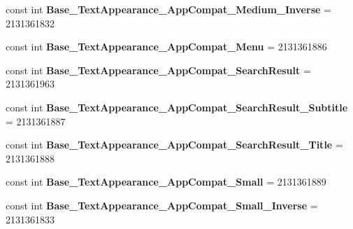 \begin{DoxyCompactItemize}
\mbox{\label{class_pinned_app_1_1_droid_1_1_resource_1_1_style_a66ab5bec5137b91f848f9b60e7569954}} 
const int {\bfseries Base\+\_\+\+Text\+Appearance\+\_\+\+App\+Compat\+\_\+\+Medium\+\_\+\+Inverse} = 2131361832
\item 
\mbox{\label{class_pinned_app_1_1_droid_1_1_resource_1_1_style_a16ab7110f7e310e6021c44d452a394b5}} 
const int {\bfseries Base\+\_\+\+Text\+Appearance\+\_\+\+App\+Compat\+\_\+\+Menu} = 2131361886
\item 
\mbox{\label{class_pinned_app_1_1_droid_1_1_resource_1_1_style_a14d59eb57122e1e0d90aa902d70ad44b}} 
const int {\bfseries Base\+\_\+\+Text\+Appearance\+\_\+\+App\+Compat\+\_\+\+Search\+Result} = 2131361963
\item 
\mbox{\label{class_pinned_app_1_1_droid_1_1_resource_1_1_style_a00326006a94efb8185769e514ea374a5}} 
const int {\bfseries Base\+\_\+\+Text\+Appearance\+\_\+\+App\+Compat\+\_\+\+Search\+Result\+\_\+\+Subtitle} = 2131361887
\item 
\mbox{\label{class_pinned_app_1_1_droid_1_1_resource_1_1_style_ae6ff0b29e72178971f98d2db36aaf52b}} 
const int {\bfseries Base\+\_\+\+Text\+Appearance\+\_\+\+App\+Compat\+\_\+\+Search\+Result\+\_\+\+Title} = 2131361888
\item 
\mbox{\label{class_pinned_app_1_1_droid_1_1_resource_1_1_style_a0a717a869250f4e630799eb4305fec88}} 
const int {\bfseries Base\+\_\+\+Text\+Appearance\+\_\+\+App\+Compat\+\_\+\+Small} = 2131361889
\item 
\mbox{\label{class_pinned_app_1_1_droid_1_1_resource_1_1_style_abef09c4ddc92ea389ac49b999ddbddfa}} 
const int {\bfseries Base\+\_\+\+Text\+Appearance\+\_\+\+App\+Compat\+\_\+\+Small\+\_\+\+Inverse} = 2131361833
\item 
\mbox{\label{class_pinned_app_1_1_droid_1_1_resource_1_1_style_a53a7ce8efff23a586fda5a755ed3a84c}} 

\end{DoxyCompactItemize}
